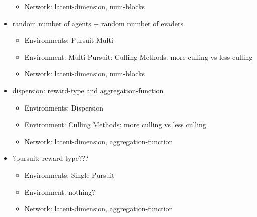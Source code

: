 \begin{itemize}[noitemsep,nolistsep]
\begin{itemize}[noitemsep,nolistsep]
        \item Network: latent-dimension, num-blocks
    \end{itemize}
    \item random number of agents + random number of evaders
    \begin{itemize}[noitemsep,nolistsep]
        \item Environments: Pursuit-Multi
        \item Environment: Multi-Pursuit: Culling Methods: more culling vs less culling
        \item Network: latent-dimension, num-blocks
    \end{itemize}
    \item dispersion: reward-type and aggregation-function
    \begin{itemize}[noitemsep,nolistsep]
        \item Environments: Dispersion
        \item Environment: Culling Methods: more culling vs less culling
        \item Network: latent-dimension, aggregation-function
    \end{itemize}
    \item ?pursuit: reward-type???
    \begin{itemize}[noitemsep,nolistsep]
        \item Environments: Single-Pursuit
        \item Environment: nothing?
        \item Network: latent-dimension, aggregation-function
    \end{itemize}
\end{itemize} 